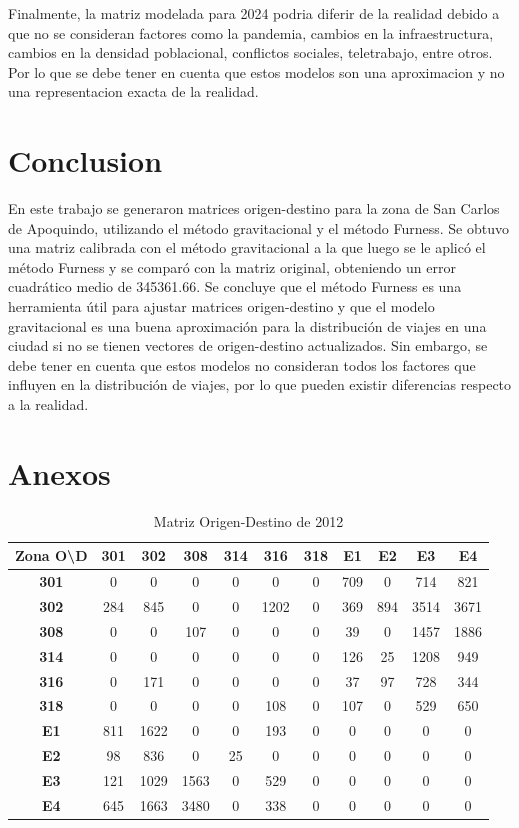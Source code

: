 \documentclass[letterpaper,12pt]{article}
\begin{document}
Finalmente, la matriz modelada para 2024 podria diferir de la realidad debido a que no se consideran factores como la pandemia, cambios en la infraestructura, cambios en la densidad poblacional, conflictos sociales, teletrabajo, entre otros. Por lo que se debe tener en cuenta que estos modelos son una aproximacion y no una representacion exacta de la realidad.

\section{Conclusion}

En este trabajo se generaron matrices origen-destino para la zona de San Carlos de Apoquindo, utilizando el método gravitacional y el método Furness. Se obtuvo una matriz calibrada con el método gravitacional a la que luego se le aplicó el método Furness y se comparó con la matriz original, obteniendo un error cuadrático medio de 345361.66. Se concluye que el método Furness es una herramienta útil para ajustar matrices origen-destino y que el modelo gravitacional es una buena aproximación para la distribución de viajes en una ciudad si no se tienen vectores de origen-destino actualizados. Sin embargo, se debe tener en cuenta que estos modelos no consideran todos los factores que influyen en la distribución de viajes, por lo que pueden existir diferencias respecto a la realidad.

\newpage
\section{Anexos}
\begin{table}[h!]
    \centering
    \begin{tabular}{c|cccccccccc}    
    \textbf{Zona O\textbackslash D} & \textbf{301} & \textbf{302} & \textbf{308} & \textbf{314} & \textbf{316} & \textbf{318} & \textbf{E1} & \textbf{E2} & \textbf{E3} & \textbf{E4} \\ \hline
    \textbf{301} & 0 & 0 & 0 & 0 & 0 & 0 & 709 & 0 & 714 & 821 \\ 
    \textbf{302} & 284 & 845 & 0 & 0 & 1202 & 0 & 369 & 894 & 3514 & 3671 \\ 
    \textbf{308} & 0 & 0 & 107 & 0 & 0 & 0 & 39 & 0 & 1457 & 1886 \\ 
    \textbf{314} & 0 & 0 & 0 & 0 & 0 & 0 & 126 & 25 & 1208 & 949 \\ 
    \textbf{316} & 0 & 171 & 0 & 0 & 0 & 0 & 37 & 97 & 728 & 344 \\ 
    \textbf{318} & 0 & 0 & 0 & 0 & 108 & 0 & 107 & 0 & 529 & 650 \\ 
    \textbf{E1} & 811 & 1622 & 0 & 0 & 193 & 0 & 0 & 0 & 0 & 0 \\ 
    \textbf{E2} & 98 & 836 & 0 & 25 & 0 & 0 & 0 & 0 & 0 & 0 \\ 
    \textbf{E3} & 121 & 1029 & 1563 & 0 & 529 & 0 & 0 & 0 & 0 & 0 \\ 
    \textbf{E4} & 645 & 1663 & 3480 & 0 & 338 & 0 & 0 & 0 & 0 & 0 \\ 
    \end{tabular}
    \caption{Matriz Origen-Destino de 2012}
    \label{table:data_matrix}
\end{table}
\end{document}
